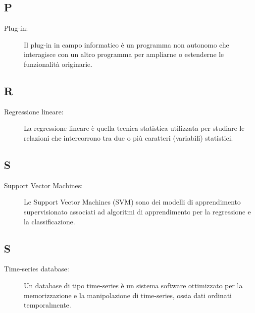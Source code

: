 \documentclass[../manuale-sviluppatore.tex]{subfiles}
\begin{document}
\subsection*{P}
\begin{description}
  \item[Plug-in:] Il plug-in in campo informatico è un programma non autonomo che interagisce con un altro programma per ampliarne o estenderne le funzionalità originarie.
\end{description}

\subsection*{R}
\begin{description}
  \item[Regressione lineare:] La regressione lineare è quella tecnica statistica utilizzata per studiare le relazioni che intercorrono tra due o più caratteri (variabili) statistici.
\end{description}

\subsection*{S}
\begin{description}
  \item[Support Vector Machines:] Le Support Vector Machines (SVM) sono dei modelli di apprendimento supervisionato associati ad algoritmi di apprendimento per la regressione e la classificazione.
\end{description}

\subsection*{S}
\begin{description}
  \item [Time-series database:] Un database di tipo time-series è un sistema software ottimizzato per la memorizzazione e la manipolazione di time-series, ossia dati ordinati temporalmente.
\end{description}
\end{document}
